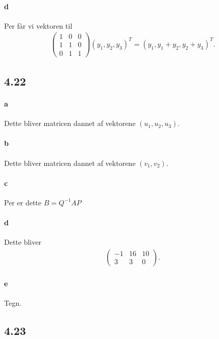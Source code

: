 			\paragraph{d} Per \cite[Eks. 4.4.18]{hesselholt2017} får vi vektoren til 
				\begin{align*}
					\left(\begin{array}{rrr} {1} & {0} & {0} \\ {1} & {1} & {0} \\ {0} & {1} & {1} \end{array}\right) (y_1,y_2,y_3)^T=(y_1,y_1+y_2,y_2+y_3)^T.
				\end{align*}

		\subsection{4.22}

			\paragraph{a} Dette bliver matricen dannet af vektorene $(u_1,u_2,u_3)$.

			\paragraph{b} Dette bliver matricen dannet af vektorene $(v_1,v_2)$.

			\paragraph{c} Per \cite[Sætning 4.4.14]{hesselholt2017} er dette $B=Q^{-1}AP$

			\paragraph{d} Dette bliver
				\begin{align*}
					\left(\begin{array}{rrr} {-1} & {16} & {10} \\ {3} & {3} & {0} \end{array}\right).
				\end{align*} 

			\paragraph{e} Tegn.

		\subsection{4.23}


